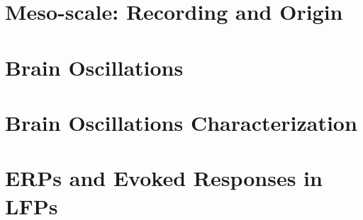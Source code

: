 \documentclass[12pt]{article}
\begin{document}
\section{Meso-scale: Recording and Origin}
\graphicspath{ {./images/9/} }

\newpage

\section{Brain Oscillations}
\graphicspath{ {./images/10/} }

\newpage

\section{Brain Oscillations Characterization}
\graphicspath{ {./images/11/} }

\newpage

\section{ERPs and Evoked Responses in LFPs}
\graphicspath{ {./images/12/} }

\newpage
\end{document}
